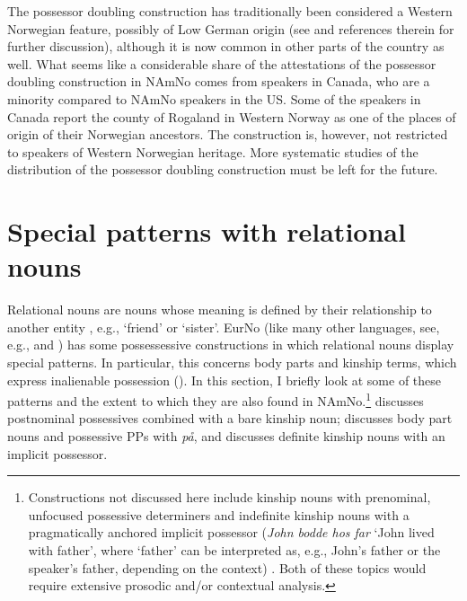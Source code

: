 \documentclass[output=paper,colorlinks,citecolor=brown]{langscibook}
\begin{document}
The possessor doubling construction has traditionally been  considered a Western Norwegian feature, possibly of Low German origin (see \citealt{norde2012possessordoubling} and references therein for further discussion), although it is now common in other parts of the country as well. 
What seems like a considerable share of the attestations of the possessor doubling construction in NAmNo comes from speakers in Canada, who are a minority compared to NAmNo speakers in the US. Some of the speakers in Canada report the county of Rogaland in Western Norway as one of the places of origin of their Norwegian ancestors. The construction is, however, not restricted to speakers of Western Norwegian heritage. More systematic studies of the distribution of the possessor doubling construction must be left for the future. 



\section{Special patterns with relational nouns}\label{sec:special} 
Relational nouns are nouns whose meaning is defined by their relationship to another entity  \citep{matthews2014dictionaryoflinguistics}, e.g., `friend' or `sister'. EurNo (like many other languages, see, e.g., \citealt{stolzetal2008splitpossession} and \citealt[chap. 10]{dixon2010basic}) has some possessessive constructions in which relational nouns display special patterns. In particular, this concerns body parts and kinship terms, which express inalienable possession (\citealt{lødrup2009external, lødrup2014kinship, lodrup2018prominent, johannessenjulienlødrup2014menneskesentrert}). In this section, I  briefly look at some of these patterns and the extent to which they are also found in NAmNo.\footnote{Constructions not discussed here include kinship nouns with prenominal, unfocused possessive determiners and indefinite kinship nouns with a pragmatically anchored implicit possessor (\emph{John bodde hos far} `John lived with father', 
where `father' can be interpreted as, e.g., John's father or the speaker's father, depending on the context) \citep{lødrup2014kinship}. Both of these topics would require extensive prosodic and/or contextual analysis.}  discusses postnominal possessives combined with a bare kinship noun;  discusses body part nouns and possessive PPs with \emph{på}, and  discusses definite kinship nouns with an implicit possessor.
\end{document}
